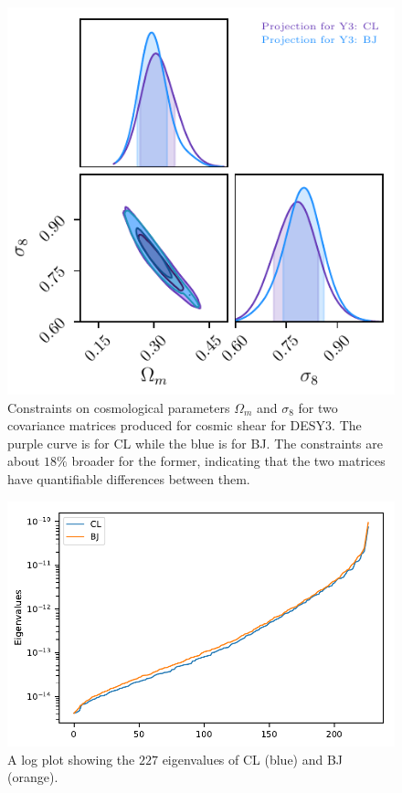 \documentclass[twocolumn]{\docclass}
\begin{document}
	\begin{figure}
		\includegraphics[width=0.9\columnwidth]{Y3-comparison.pdf}
		\caption{Constraints on cosmological parameters $\Omega_m$ and $\sigma_8$ for two covariance matrices produced for cosmic shear for DESY3. The purple curve is for CL while the blue is for BJ. The constraints are about $18 \%$ broader for the former, indicating that the two matrices have quantifiable differences between them. \label{fig:y3-comparison}}
	\end{figure}
	
	\begin{figure}
		\includegraphics[width=0.9\columnwidth]{Eigenvalues/Eigenvalues_Y3_BJ-CL.pdf}
		\caption{A log plot showing the $227$ eigenvalues of CL (blue) and BJ (orange). \label{fig:coveigen}}
	\end{figure}
	
\end{document}
